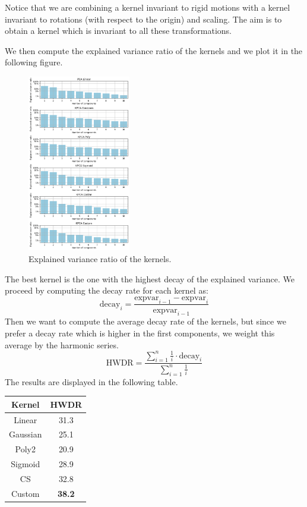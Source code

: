 Notice that we are combining a kernel invariant to rigid motions with 
a kernel invariant to rotations (with respect to the origin) and scaling.
The aim is to obtain a kernel which is invariant to all these transformations.

We then compute the explained variance ratio of the kernels and we
plot it in the following figure.
\begin{figure}[H]
    \centering
    \includegraphics[width=0.4\textwidth]{figures/expvar_ratio_plot.png}
    \caption{Explained variance ratio of the kernels.}
\end{figure}

The best kernel is the one with the highest decay of the explained variance.
We proceed by computing the decay rate for each kernel as:
$$
    \text{decay}_i = \frac{\text{expvar}_{i-1} - \text{expvar}_i}{\text{expvar}_{i-1}}
$$
Then we want to compute the average decay rate of the kernels, but since we
prefer a decay rate which is higher in the first components, we weight this
average by the harmonic series.
$$
    \text{HWDR} = \frac{\sum_{i=1}^{n} \frac{1}{i} \cdot \text{decay}_i}{\sum_{i=1}^{n} \frac{1}{i}}
$$
The results are displayed in the following table.

\begin{table}[H]
    \centering
    \begin{tabular}{|c|c|}
        \hline
        Kernel      & HWDR \\
        \hline
        Linear      & 31.3 \\
        Gaussian    & 25.1 \\
        Poly2       & 20.9 \\
        Sigmoid     & 28.9 \\
        CS          & 32.8 \\
        Custom      & \textbf{38.2} \\
        \hline
    \end{tabular}
\end{table}

